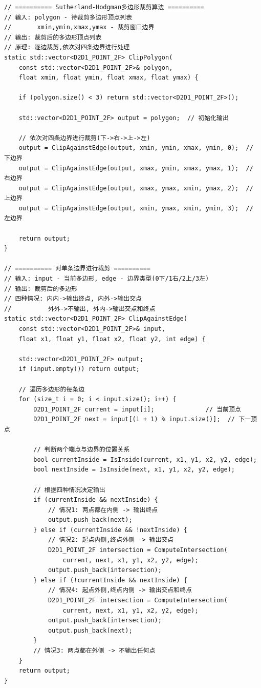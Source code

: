 \documentclass[12pt,a4paper]{article}
\begin{document}
\begin{tcolorbox}
\begin{lstlisting}[caption={Sutherland-Hodgman多边形裁剪算法}]
// ========== Sutherland-Hodgman多边形裁剪算法 ==========
// 输入: polygon - 待裁剪多边形顶点列表
//       xmin,ymin,xmax,ymax - 裁剪窗口边界
// 输出: 裁剪后的多边形顶点列表
// 原理: 逐边裁剪,依次对四条边界进行处理
static std::vector<D2D1_POINT_2F> ClipPolygon(
    const std::vector<D2D1_POINT_2F>& polygon,
    float xmin, float ymin, float xmax, float ymax) {
    
    if (polygon.size() < 3) return std::vector<D2D1_POINT_2F>();
    
    std::vector<D2D1_POINT_2F> output = polygon;  // 初始化输出
    
    // 依次对四条边界进行裁剪(下->右->上->左)
    output = ClipAgainstEdge(output, xmin, ymin, xmax, ymin, 0);  // 下边界
    output = ClipAgainstEdge(output, xmax, ymin, xmax, ymax, 1);  // 右边界
    output = ClipAgainstEdge(output, xmax, ymax, xmin, ymax, 2);  // 上边界
    output = ClipAgainstEdge(output, xmin, ymax, xmin, ymin, 3);  // 左边界
    
    return output;
}

// ========== 对单条边界进行裁剪 ==========
// 输入: input - 当前多边形, edge - 边界类型(0下/1右/2上/3左)
// 输出: 裁剪后的多边形
// 四种情况: 内内->输出终点, 内外->输出交点
//          外外->不输出, 外内->输出交点和终点
static std::vector<D2D1_POINT_2F> ClipAgainstEdge(
    const std::vector<D2D1_POINT_2F>& input,
    float x1, float y1, float x2, float y2, int edge) {
    
    std::vector<D2D1_POINT_2F> output;
    if (input.empty()) return output;
    
    // 遍历多边形的每条边
    for (size_t i = 0; i < input.size(); i++) {
        D2D1_POINT_2F current = input[i];              // 当前顶点
        D2D1_POINT_2F next = input[(i + 1) % input.size()];  // 下一顶点
        
        // 判断两个端点与边界的位置关系
        bool currentInside = IsInside(current, x1, y1, x2, y2, edge);
        bool nextInside = IsInside(next, x1, y1, x2, y2, edge);
        
        // 根据四种情况决定输出
        if (currentInside && nextInside) {
            // 情况1: 两点都在内侧 -> 输出终点
            output.push_back(next);
        } else if (currentInside && !nextInside) {
            // 情况2: 起点内侧,终点外侧 -> 输出交点
            D2D1_POINT_2F intersection = ComputeIntersection(
                current, next, x1, y1, x2, y2, edge);
            output.push_back(intersection);
        } else if (!currentInside && nextInside) {
            // 情况4: 起点外侧,终点内侧 -> 输出交点和终点
            D2D1_POINT_2F intersection = ComputeIntersection(
                current, next, x1, y1, x2, y2, edge);
            output.push_back(intersection);
            output.push_back(next);
        }
        // 情况3: 两点都在外侧 -> 不输出任何点
    }
    return output;
}
\end{lstlisting}

\end{tcolorbox}
\end{document}
